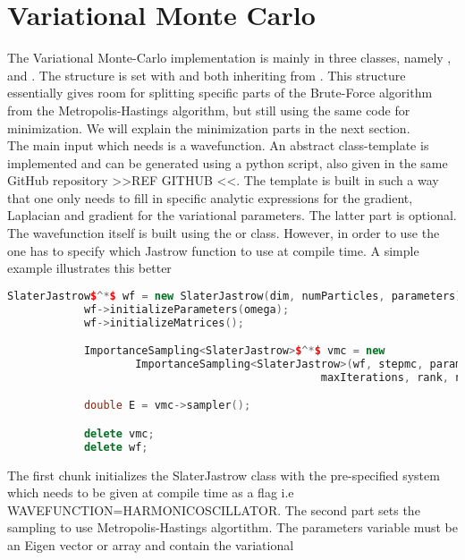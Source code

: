 \section{Variational Monte Carlo}
    The Variational Monte-Carlo implementation is mainly in three classes,
    namely ,  and
    . The structure is set with
     and  both inheriting
    from . This structure essentially gives room for splitting
    specific parts of the Brute-Force algorithm from the Metropolis-Hastings
    algorithm, but still using the same code for minimization. We will explain
    the minimization parts in the next section. \\ 
    The main input which  needs is a wavefunction. An abstract
    class-template is implemented and can be generated using a python script,
    also given in the same GitHub repository >>REF GITHUB <<. The template is
    built in such a way that one only needs to fill in specific analytic
    expressions for the gradient, Laplacian and gradient for the variational
    parameters. The latter part is optional. \\ 
    The wavefunction itself is built using the  or
     class. However, in order to use the
     one has to specify which Jastrow function to use
    at compile time. A simple example illustrates this better
        \begin{lstlisting}[language=C++, style=ccstyle]
            SlaterJastrow$^*$ wf = new SlaterJastrow(dim, numParticles, parameters);
            wf->initializeParameters(omega);
            wf->initializeMatrices();

            ImportanceSampling<SlaterJastrow>$^*$ vmc = new
                    ImportanceSampling<SlaterJastrow>(wf, stepmc, parameters,
                                                 maxIterations, rank, numProcs);

            double E = vmc->sampler();

            delete vmc;
            delete wf;
        \end{lstlisting}
    The first chunk initializes the SlaterJastrow class with the pre-specified
    system which needs to be given at compile time as a flag i.e
    WAVEFUNCTION=HARMONICOSCILLATOR. The second part sets the sampling to use
    Metropolis-Hastings algortithm. The parameters variable must be an
    Eigen\cite{eigenweb} vector or array and contain the variational
